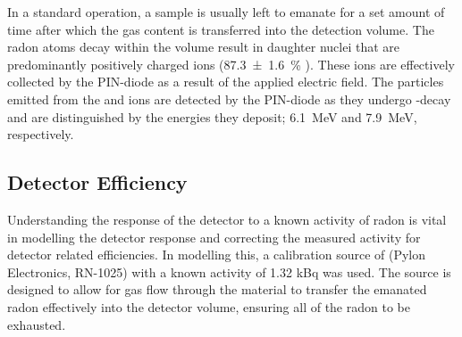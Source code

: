 In a standard operation, a sample is usually left to emanate for a set amount of time after which the gas content is transferred into the detection volume. The radon atoms decay within the volume result in daughter nuclei that are predominantly positively charged ions (\SI{87.3\pm1.6}{\percent} \cite{PAGELKOPF20031057}). These ions are effectively collected by the PIN-diode as a result of the applied electric field. The \alpha{} particles emitted from the \potoe{} and \potof{} ions are detected by the PIN-diode as they undergo \alpha{}-decay and are distinguished by the energies they deposit; \SI{6.1}{\mega\electronvolt} and \SI{7.9}{\mega\electronvolt}, respectively. 


\subsection{Detector Efficiency}
\label{sec:detector_efficiency}

Understanding the response of the detector to a known activity of radon is vital in modelling the detector response and correcting the measured activity for detector related efficiencies. In modelling this, a calibration source of \RaTTS{} (Pylon Electronics, RN-1025) with a known activity of 1.32 kBq was used. The source is designed to allow for gas flow through the material to transfer the emanated radon effectively into the detector volume, ensuring all of the radon to be exhausted.

